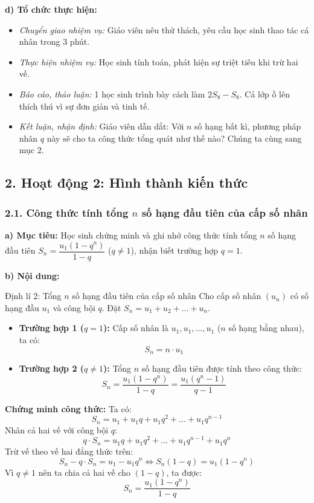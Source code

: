 \documentclass[12pt, a4paper]{article}
\begin{document}
\noindent \textbf{d) Tổ chức thực hiện:}
\begin{itemize}[leftmargin=0.8cm]
    \item \textit{Chuyển giao nhiệm vụ:} Giáo viên nêu thử thách, yêu cầu học sinh thao tác cá nhân trong 3 phút.
    \item \textit{Thực hiện nhiệm vụ:} Học sinh tính toán, phát hiện sự triệt tiêu khi trừ hai vế.
    \item \textit{Báo cáo, thảo luận:} 1 học sinh trình bày cách làm $2S_8 - S_8$. Cả lớp ồ lên thích thú vì sự đơn giản và tinh tế.
    \item \textit{Kết luận, nhận định:} Giáo viên dẫn dắt: Với $n$ số hạng bất kì, phương pháp nhân $q$ này sẽ cho ta công thức tổng quát như thế nào? Chúng ta cùng sang mục 2.
\end{itemize}

\subsection*{2. Hoạt động 2: Hình thành kiến thức}

\subsubsection*{2.1. Công thức tính tổng $n$ số hạng đầu tiên của cấp số nhân}

\noindent \textbf{a) Mục tiêu:}
Học sinh chứng minh và ghi nhớ công thức tính tổng $n$ số hạng đầu tiên $S_n = \dfrac{u_1(1 - q^n)}{1 - q}$ ($q \neq 1$), nhận biết trường hợp $q = 1$.

\noindent \textbf{b) Nội dung:}
\begin{pedabox}{Định lí 2: Tổng $n$ số hạng đầu tiên của cấp số nhân}
Cho cấp số nhân $(u_n)$ có số hạng đầu $u_1$ và công bội $q$. Đặt $S_n = u_1 + u_2 + \dots + u_n$.
\begin{itemize}[leftmargin=0.6cm]
    \item \textbf{Trường hợp 1 ($q = 1$):} Cấp số nhân là $u_1, u_1, \dots, u_1$ ($n$ số hạng bằng nhau), ta có:
    $$S_n = n \cdot u_1$$
    \item \textbf{Trường hợp 2 ($q \neq 1$):} Tổng $n$ số hạng đầu tiên được tính theo công thức:
    $$S_n = \dfrac{u_1(1 - q^n)}{1 - q} = \dfrac{u_1(q^n - 1)}{q - 1}$$
\end{itemize}
\end{pedabox}

\textbf{Chứng minh công thức:}
Ta có:
$$S_n = u_1 + u_1 q + u_1 q^2 + \dots + u_1 q^{n-1}$$
Nhân cả hai vế với công bội $q$:
$$q \cdot S_n = u_1 q + u_1 q^2 + \dots + u_1 q^{n-1} + u_1 q^n$$
Trừ vế theo vế hai đẳng thức trên:
$$S_n - q \cdot S_n = u_1 - u_1 q^n \iff S_n(1 - q) = u_1(1 - q^n)$$
Vì $q \neq 1$ nên ta chia cả hai vế cho $(1 - q)$, ta được:
$$S_n = \dfrac{u_1(1 - q^n)}{1 - q}$$
\end{document}
